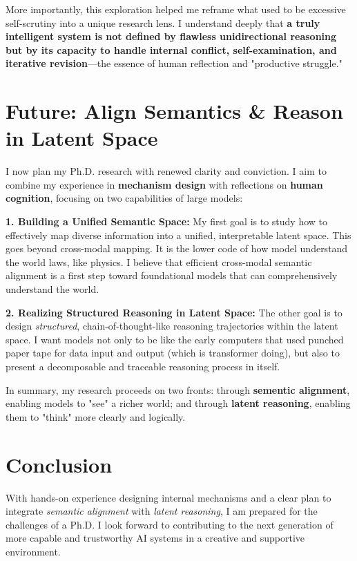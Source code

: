 \documentclass[11pt, letterpaper]{article}
\begin{document}
More importantly, this exploration helped me reframe what used to be excessive self-scrutiny into a unique research lens. I understand deeply that \textbf{a truly intelligent system is not defined by flawless unidirectional reasoning but by its capacity to handle internal conflict, self-examination, and iterative revision}—the essence of human reflection and "productive struggle."

\section{Future: Align Semantics \& Reason in Latent Space}

I now plan my Ph.D. research with renewed clarity and conviction. I aim to combine my experience in \textbf{mechanism design} with reflections on \textbf{human cognition}, focusing on two capabilities of large models:

\textbf{1. Building a Unified Semantic Space:} My first goal is to study how to effectively map diverse information into a unified, interpretable latent space. This goes beyond cross-modal mapping. It is the lower code of how model understand the world laws, like physics. I believe that efficient cross-modal semantic alignment is a first step toward foundational models that can comprehensively understand the world.

\textbf{2. Realizing Structured Reasoning in Latent Space:} The other goal is to design \emph{structured}, chain-of-thought-like reasoning trajectories within the latent space. I want models not only to be like the early computers that used punched paper tape for data input and output (which is transformer doing), but also to present a decomposable and traceable reasoning process in itself.

In summary, my research proceeds on two fronts: through \textbf{sementic alignment}, enabling models to "see" a richer world; and through \textbf{latent reasoning}, enabling them to "think" more clearly and logically.

\section{Conclusion}

With hands-on experience designing internal mechanisms and a clear plan to integrate \emph{semantic alignment} with \emph{latent reasoning}, I am prepared for the challenges of a Ph.D. I look forward to contributing to the next generation of more capable and trustworthy AI systems in a creative and supportive environment.



\end{document}
